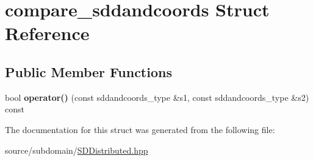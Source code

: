 \hypertarget{structcompare__sddandcoords}{}\section{compare\+\_\+sddandcoords Struct Reference}
\label{structcompare__sddandcoords}
\subsection*{Public Member Functions}
\begin{DoxyCompactItemize}
\item 
\mbox{\label{structcompare__sddandcoords_ab03bff248c467c2f312914668aec8927}} 
bool {\bfseries operator()} (const sddandcoords\+\_\+type \&s1, const sddandcoords\+\_\+type \&s2) const
\end{DoxyCompactItemize}


The documentation for this struct was generated from the following file\+:\begin{DoxyCompactItemize}
\item 
source/subdomain/\hyperlink{source_2subdomain_2SDDistributed_8hpp}{S\+D\+Distributed.\+hpp}\end{DoxyCompactItemize}
